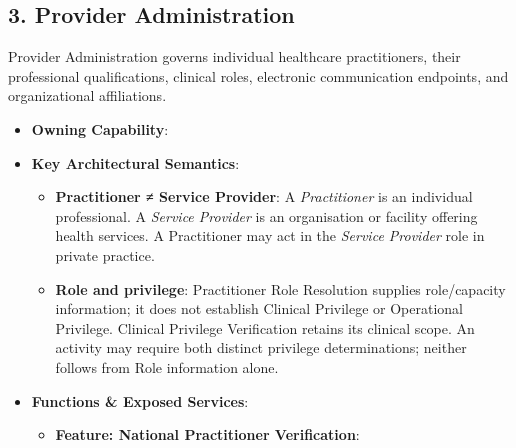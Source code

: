 \par\smallskip
{}\label{rad:em:82}
\subsection*{3. Provider Administration}
\label{rad:em:84}

Provider Administration governs individual healthcare practitioners, their professional qualifications, clinical roles, electronic communication endpoints, and organizational affiliations.

\label{rad:em:86}

\begin{itemize}

\item
\textbf{Owning Capability}: \texttt{}



\item
\textbf{Key Architectural Semantics}:


\begin{itemize}

\item
\textbf{Practitioner ≠ Service Provider}: A \emph{Practitioner} is an individual professional. A \emph{Service Provider} is an organisation or facility offering health services. A Practitioner may act in the \emph{Service Provider} role in private practice.



\item
\textbf{Role and privilege}: Practitioner Role Resolution supplies role/\allowbreak{}capacity information; it does not establish Clinical Privilege or Operational Privilege. Clinical Privilege Verification retains its clinical scope. An activity may require both distinct privilege determinations; neither follows from Role information alone.



\end{itemize}


\item
\textbf{Functions \& Exposed Services}:


\begin{itemize}

\item
\textbf{Feature: National Practitioner Verification}:


\begin{itemize}


\end{itemize}
\end{itemize}
\end{itemize}
